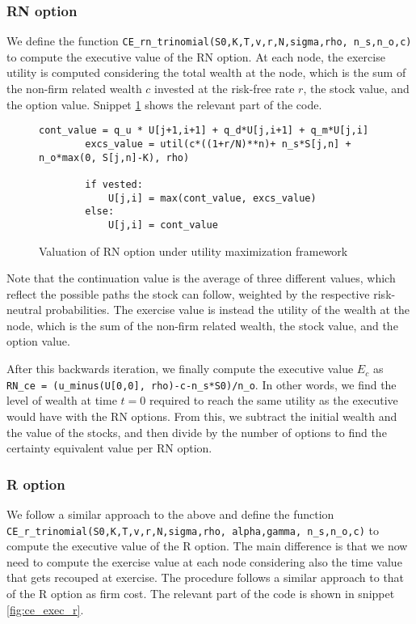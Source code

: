 \subsubsection{RN option}
We define the function \verb|CE_rn_trinomial(S0,K,T,v,r,N,sigma,rho, n_s,n_o,c)| to compute the executive value of the RN option. At each node, the exercise utility is computed considering the total wealth at the node, which is the sum of the non-firm related wealth $c$ invested at the risk-free rate $r$, the stock value, and the option value. Snippet \ref*{fig:ce_exec_rn} shows the relevant part of the code.

\begin{figure}[H]
    \begin{lstlisting}[breaklines, basicstyle=\ttfamily\small]
        cont_value = q_u * U[j+1,i+1] + q_d*U[j,i+1] + q_m*U[j,i]
        excs_value = util(c*((1+r/N)**n)+ n_s*S[j,n] + n_o*max(0, S[j,n]-K), rho)
        
        if vested:
            U[j,i] = max(cont_value, excs_value)
        else: 
            U[j,i] = cont_value
    \end{lstlisting}
 \label{fig:ce_exec_rn}
 \caption{Valuation of RN option under utility maximization framework}
\end{figure}

Note that the continuation value is the average of three different values, which reflect the possible paths the stock can follow, weighted by the respective risk-neutral probabilities. The exercise value is instead the utility of the wealth at the node, which is the sum of the non-firm related wealth, the stock value, and the option value. 

After this backwards iteration, we finally compute the executive value $E_c$ as \\
\verb|RN_ce = (u_minus(U[0,0], rho)-c-n_s*S0)/n_o|.
In other words, we find the level of wealth at time $t=0$ required to reach the same utility as the executive would have with the RN options. From this, we subtract the initial wealth and the value of the stocks, and then divide by the number of options to find the certainty equivalent value per RN option.

\subsubsection{R option}
We follow a similar approach to the above and define the function\\
\verb|CE_r_trinomial(S0,K,T,v,r,N,sigma,rho, alpha,gamma, n_s,n_o,c)| to compute the executive value of the R option. The main difference is that we now need to compute the exercise value at each node considering also the time value that gets recouped at exercise. The procedure follows a similar approach to that of the R option as firm cost. The relevant part of the code is shown in snippet \ref*{fig:ce_exec_r}.

